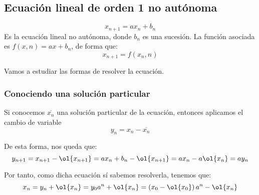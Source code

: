 \subsection{Ecuación lineal de orden 1 no autónoma}
$$x_{n+1} = ax_n + b_n$$
Es la ecuación lineal no autónoma, donde $b_n$ es una sucesión. La función asociada es $f(x,n) = ax + b_n$, de forma que:
$$x_{n+1} = f(x_n, n)$$

Vamos a estudiar las formas de resolver la ecuación. 

\subsubsection{Conociendo una solución particular}
Si conocemos $\overline{x_n}$ una solución particular de la ecuación, entonces aplicamos el cambio de variable
$$y_n = x_n - \overline{x_n}$$

De esta forma, nos queda que:
\begin{equation*}
    y_{n+1} = x_{n+1} - \ol{x_{n+1}}
    = ax_n + b_n - \ol{x_{n+1}} = ax_n - a\ol{x_n} = ay_n
\end{equation*}

Por tanto, como dicha ecuación sí sabemos resolverla, tenemos que:
$$x_n = y_n + \ol{x_n} = y_0 a^n + \ol{x_n} = \left(x_0-\ol{x_0}\right)a^n - \ol{x_n}$$

